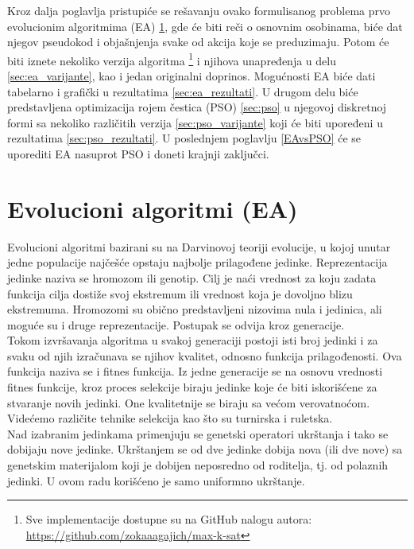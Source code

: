 \documentclass[a4paper]{article}
\begin{document}
Kroz dalja poglavlja pristupiće se rešavanju ovako formulisanog problema prvo evolucionim
algoritmima (EA) \ref{sec:ea}, gde će biti reči o osnovnim osobinama, 
biće dat njegov pseudokod i objašnjenja svake od akcija koje se preduzimaju. 
Potom će biti iznete nekoliko verzija  algoritma
\footnote{Sve implementacije dostupne su na GitHub nalogu autora: \\
\url{https://github.com/zokaaagajich/max-k-sat}} 
i njihova unapređenja u delu \ref{sec:ea_varijante}, kao i jedan originalni doprinos.
Mogućnosti EA biće dati tabelarno i grafički u
rezultatima \ref{sec:ea_rezultati}. U drugom delu biće predstavljena optimizacija
rojem čestica (PSO) \ref{sec:pso} u njegovoj diskretnoj formi sa 
nekoliko različitih verzija \ref{sec:pso_varijante} koji će biti upoređeni 
u rezultatima \ref{sec:pso_rezultati}. U poslednjem poglavlju \ref{EAvsPSO} 
će se uporediti EA nasuprot PSO i doneti krajnji zaključci.


\section{Evolucioni algoritmi (EA)}
\label{sec:ea}
Evolucioni algoritmi \cite{vi_Janicic} bazirani su na Darvinovoj teoriji evolucije, 
u kojoj unutar jedne populacije najčešće opstaju najbolje prilagođene jedinke. 
Reprezentacija jedinke naziva se hromozom ili genotip. 
Cilj je naći vrednost za koju zadata funkcija cilja dostiže svoj ekstremum 
ili vrednost koja je dovoljno blizu ekstremuma. Hromozomi su obično predstavljeni
nizovima nula i jedinica, ali moguće su i druge reprezentacije. 
Postupak se odvija kroz generacije.\\

Tokom izvršavanja algoritma u svakoj generaciji postoji isti broj jedinki i za svaku od
njih izračunava se njihov kvalitet, odnosno funkcija prilagođenosti.
Ova funkcija naziva se i fitnes funkcija.
Iz jedne generacije se na osnovu vrednosti fitnes funkcije, 
kroz proces selekcije biraju jedinke koje će biti iskorišćene za stvaranje novih jedinki. 
One kvalitetnije se biraju sa većom verovatnoćom. 
Videćemo različite tehnike selekcija kao što su turnirska i ruletska. \\

Nad izabranim jedinkama primenjuju se genetski operatori ukrštanja
i tako se dobijaju nove jedinke. Ukrštanjem se od dve jedinke dobija nova (ili dve nove) sa
genetskim materijalom koji je dobijen neposredno od roditelja, 
tj. od polaznih jedinki. U ovom radu korišćeno je samo uniformno ukrštanje. \\
\end{document}
